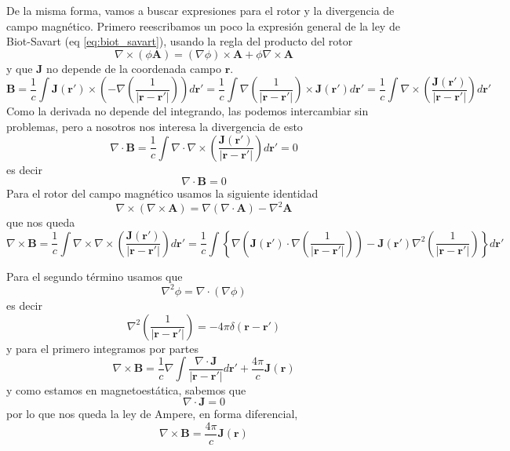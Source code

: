 \documentclass[a4paper]{article}
\numberwithin{equation}{section} %
\renewcommand{\vec}[1]{\boldsymbol{#1}}
\newcommand{\rinv}{\frac{1}{|\vec{r} - \vec{r}'|}}
\begin{document}
De la misma forma, vamos a buscar expresiones para el rotor y la divergencia de campo magnético. Primero reescribamos un poco la expresión general de la ley de Biot-Savart (eq \ref{eq:biot_savart}), usando la regla del producto del rotor
\[ \nabla \times (\phi \vec{A}) = (\nabla \phi) \times \vec{A} + \phi \nabla \times \vec{A} \]
y que $\vec{J}$ no depende de la coordenada campo $\vec{r}$.
\[ \vec{B} = \frac{1}{c} \int  \vec{J}(\vec{r}') \times \left(- \nabla\left(\rinv\right) \right) d\vec{r}' = \frac{1}{c} \int  \nabla\left(\rinv\right) \times \vec{J}(\vec{r}') d\vec{r}' = \frac{1}{c} \int \nabla \times \left( \frac{\vec{J}(\vec{r}')}{|\vec{r} - \vec{r}'|}\right) d\vec{r}'\]
Como la derivada no depende del integrando, las podemos intercambiar sin problemas, pero a nosotros nos interesa la divergencia de esto
\[ \nabla \cdot \vec{B} = \frac{1}{c} \int  \nabla \cdot \nabla \times \left( \frac{\vec{J}(\vec{r}')}{|\vec{r} - \vec{r}'|}\right) d\vec{r}' = 0\]
es decir
\begin{equation}
    \nabla \cdot \vec{B} = 0
    \label{eq:gauss_magnetico}
\end{equation}
Para el rotor del campo magnético usamos la siguiente identidad
\begin{equation}
\nabla \times \left( \nabla \times \vec{A} \right) = \nabla(\nabla \cdot \vec{A}) - \nabla^{2}\vec{A}
\end{equation}
que nos queda
\[ \nabla \times \vec{B} = \frac{1}{c} \int  \nabla \times \nabla \times \left( \frac{\vec{J}(\vec{r}')}{|\vec{r} - \vec{r}'|}\right) d\vec{r}' = \frac{1}{c} \int \left\{ \nabla  \left(\vec{J}(\vec{r}') \cdot \nabla \left( \rinv \right) \right) - \vec{J}(\vec{r}') \nabla^2 \left( \rinv \right) \right\} d\vec{r}' \]

Para el segundo término usamos que
\begin{equation}
    \nabla^2 \phi = \nabla \cdot (\nabla \phi)
\end{equation}
es decir
\begin{equation}
    \nabla^2 \left(\rinv\right) = - 4\pi \delta(\vec{r} - \vec{r}')
\end{equation}
y para el primero integramos por partes
\[ \nabla \times \vec{B} = \frac{1}{c} \nabla \int \frac{\nabla \cdot \vec{J}}{|\vec{r} - \vec{r}'|} d\vec{r}' + \frac{4\pi}{c} \vec{J}(\vec{r})\]
y como estamos en magnetoestática, sabemos que
\begin{equation}
\nabla \cdot \vec{J} = 0
\end{equation}
por lo que nos queda la ley de Ampere, en forma diferencial,
\begin{equation}
\nabla \times \vec{B} = \frac{4\pi}{c} \vec{J}(\vec{r})
\label{eq:ampere}
\end{equation}
\end{document}
